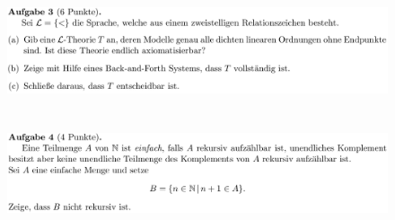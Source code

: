\documentclass[a4paper]{scrartcl}%
\begin{document}
\section*{}
\label{sec:aufgabe_3}

    \begin{figure}[H]
        \includegraphics[scale=0.3]{./A-3.png}
        \label{fig:}
    \end{figure}


\section*{}
\label{sec:aufgabe_4}

    \begin{figure}[H]
        \includegraphics[scale=0.3]{./A-4.png}
        \label{fig:}
    \end{figure}

    
\end{document}
